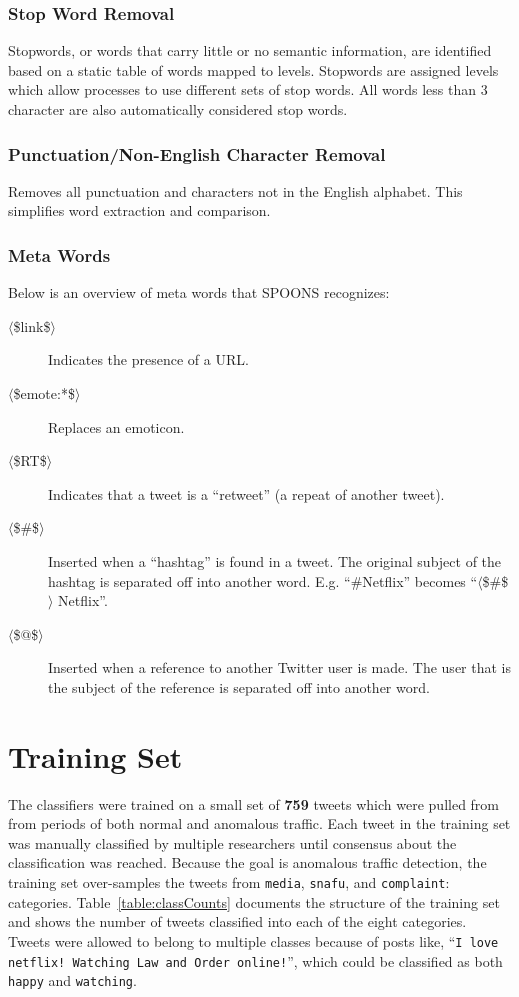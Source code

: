 \documentclass[12pt]{ucthesis}
\begin{document}
\subsubsection{Stop Word Removal}
\label{class-filter-stopword}
Stopwords, or words that carry little or no semantic information, are identified based
on a static table of words mapped to levels. Stopwords are assigned levels which allow
processes to use different sets of stop words. All words less than 3 character are also
automatically considered stop words.

\subsubsection{Punctuation/Non-English Character Removal}
\label{class-filter-noneng}
Removes all punctuation and
characters not in the English alphabet. This simplifies word extraction and
comparison.

\subsubsection{Meta Words}
\label{class-filter-meta}
Below is an overview of meta words that SPOONS recognizes:

\begin{description}
   \item[$\langle$\$link\$$\rangle$] Indicates the presence of a URL.
   \item[$\langle$\$emote:*\$$\rangle$] Replaces an emoticon.
   \item[$\langle$\$RT\$$\rangle$] Indicates that a tweet is a ``retweet'' (a repeat of another tweet).
   \item[$\langle$\$\#\$$\rangle$] Inserted when a ``hashtag'' is found in a tweet. The original subject of the hashtag is separated off into another word. E.g. ``\#Netflix'' becomes ``$\langle$\$\#\$$\rangle$ Netflix''.
   \item[$\langle$\$@\$$\rangle$] Inserted when a reference to another Twitter user is made. The user that is the subject of the reference is separated off into another word.
\end{description}

\section{Training Set}
\label{class-training-set}

The classifiers were trained on a small set of \textbf{759} tweets which were pulled from from periods of both normal and
anomalous traffic. Each tweet in the training set was manually classified by multiple researchers until consensus
about the classification was reached. Because the goal is anomalous traffic detection, the training set over-samples the
tweets from \texttt{media}, \texttt{snafu}, and \texttt{complaint}: categories. Table~\ref{table:classCounts} documents
the structure of the training set and shows the  number of tweets classified into each of the eight categories.
Tweets were allowed to belong to multiple classes because of posts like, ``\texttt{I love netflix! Watching Law and Order
online!}'', which could be classified as both \texttt{happy} and \texttt{watching}.
\end{document}
